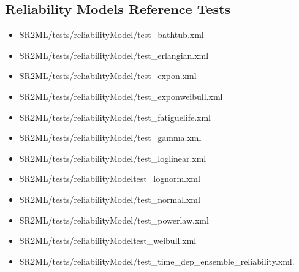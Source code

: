 \subsection{Reliability Models Reference Tests}
\begin{itemize}
	\item SR2ML/tests/reliabilityModel/test\_bathtub.xml
  \item SR2ML/tests/reliabilityModel/test\_erlangian.xml
	\item SR2ML/tests/reliabilityModel/test\_expon.xml
  \item SR2ML/tests/reliabilityModel/test\_exponweibull.xml
	\item SR2ML/tests/reliabilityModel/test\_fatiguelife.xml
  \item SR2ML/tests/reliabilityModel/test\_gamma.xml
	\item SR2ML/tests/reliabilityModel/test\_loglinear.xml
  \item SR2ML/tests/reliabilityModeltest\_lognorm.xml
	\item SR2ML/tests/reliabilityModel/test\_normal.xml
  \item SR2ML/tests/reliabilityModel/test\_powerlaw.xml
	\item SR2ML/tests/reliabilityModeltest\_weibull.xml
	\item SR2ML/tests/reliabilityModel/test\_time\_dep\_ensemble\_reliability.xml.
\end{itemize}
